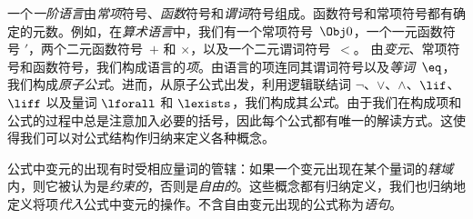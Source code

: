 一个\emph{一阶语言}由\emph{常项}符号、\emph{函数}符号和\emph{谓词}符号组成。函数符号和常项符号都有确定的元数。例如，在\emph{算术语言}中，我们有一个常项符号~$\Obj 0$，一个一元函数符号 $\prime$，两个二元函数符号~$+$ 和 $\times$，以及一个二元谓词符号~$<$。
由\emph{变元}、常项符号和函数符号，我们构成语言的\emph{项}。由语言的项连同其谓词符号以及\emph{等词}~$\eq$，我们构成\emph{原子公式}。进而，从原子公式出发，利用逻辑联结词 $\lnot$、$\lor$、$\land$、$\lif$、$\liff$ 以及量词 $\lforall$ 和 $\lexists$，我们构成其\emph{公式}。由于我们在构成项和公式的过程中总是注意加入必要的括号，因此每个公式都有唯一的解读方式。这使得我们可以对公式结构作归纳来定义各种概念。

公式中变元的出现有时受相应量词的管辖：如果一个变元出现在某个量词的\emph{辖域}内，则它被认为是\emph{约束的}，否则是\emph{自由的}。这些概念都有归纳定义，我们也归纳地定义将项\emph{代入}公式中变元的操作。不含自由变元出现的公式称为\emph{语句}。